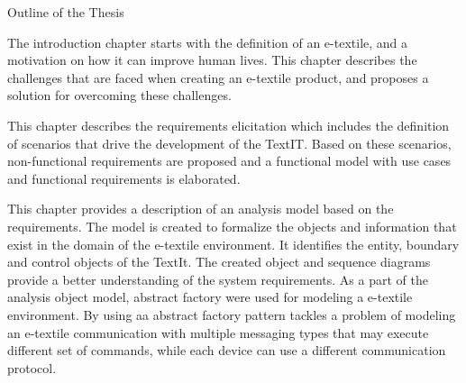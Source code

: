 \clearemptydoublepage

{}


\begin{center}
	\huge{Outline of the Thesis} 
\end{center}
\vspace{4mm}




  \vspace{1mm}



\noindent The introduction chapter starts with the definition of an e-textile, and a motivation on how it can improve human lives. This chapter describes the challenges that are faced when creating an e-textile product, and proposes a solution for overcoming these challenges.\\

  \vspace{1mm}

\noindent  This chapter describes the requirements elicitation which includes the definition of scenarios that drive the development of the TextIT. Based on these scenarios, non-functional requirements are proposed and a functional model with use cases and functional requirements is elaborated. \\

  \vspace{1mm}

\noindent  This chapter provides a description of an analysis model based on the requirements. The model is created to formalize the objects and information that exist in the domain of the e-textile environment. It identifies the entity, boundary and control objects of the TextIt. The created object and sequence diagrams provide a better understanding of the system requirements. As a part of the analysis object model, abstract factory were used for modeling a e-textile environment. By using aa abstract factory pattern tackles a problem of modeling an e-textile communication with multiple messaging types that may execute different set of commands, while each device can use a different communication protocol. \\

  \vspace{1mm}

